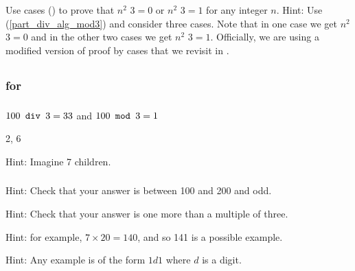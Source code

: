 \begin{exer}[\exerE] %
\label{exer_proof_cases_square_mod3}
    Use cases () to prove that $n^2$  $3 = 0$ or $n^2$  $3 = 1$ for any integer $n$. Hint: Use  (\ref{part_div_alg_mod3}) and consider three cases.  Note that in one case we get $n^2$  $3 = 0$ and in the other two cases we get $n^2$  $3 = 1$.  Officially, we are using a modified version of proof by cases that we revisit in .
\end{exer}

\subsection{\answers}

\subsubsection{\answers for  \subdivalg}

\subsubsection*{ \answers}
\begin{apart}
    \item $100 \texttt{ div } 3 = 33$ and $100 \texttt{ mod }3 = 1$
    \item 2, 6
    \item Hint: Imagine 7 children.
\end{apart}

\subsubsection*{ \answers}
\begin{apart}
    \item Hint: Check that your answer is between 100 and 200 and odd.
    \item Hint: Check that your answer is one more than a multiple of three.
    \item Hint: for example, $7 \times 20 = 140$, and so 141 is a possible example.
    \item Hint: Any example is of the form $1d1$ where $d$ is a digit.
\end{apart}

